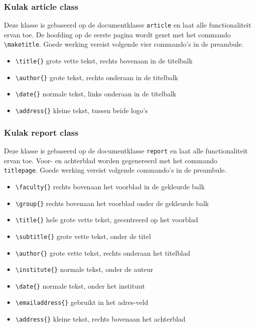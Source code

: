 \documentclass[kulak]{kulakarticle} %
\begin{document}
\subsubsection{Kulak article class}

Deze klasse is gebaseerd op de documentklasse \texttt{article} en laat alle functionaliteit ervan toe. De hoofding op de eerste pagina wordt gezet met het commando \verb+\maketitle+. Goede werking vereist volgende vier commando's in de preambule.
\begin{itemize}
\item \verb+\title{}+ grote vette tekst, rechts bovenaan in de titelbalk
\item \verb+\author{}+ grote tekst, rechts onderaan in de titelbalk
\item \verb+\date{}+ normale tekst, links onderaan in de titelbalk
\item \verb+\address{}+ kleine tekst, tussen beide logo's
\end{itemize}

\subsubsection{Kulak report class}

Deze klasse is gebaseerd op de documentklasse \texttt{report} en laat alle functionaliteit ervan toe. Voor- en achterblad worden gegenereerd met het commando \verb+titlepage+. Goede werking vereist volgende commando's in de preambule.

\begin{itemize}
\item \verb+\faculty{}+ rechts bovenaan het voorblad in de gekleurde balk
\item \verb+\group{}+ rechts bovenaan het voorblad onder de gekleurde balk
\item \verb+\title{}+ hele grote vette tekst, gecentreerd op het voorblad
\item \verb+\subtitle{}+ grote vette tekst, onder de titel
\item \verb+\author{}+ grote vette tekst, rechts onderaan het titelblad
\item \verb+\institute{}+ normale tekst, onder de auteur
\item \verb+\date{}+ normale tekst, onder het instituut
\item \verb+\emailaddress{}+ gebruikt in het adres-veld
\item \verb+\address{}+ kleine tekst, rechts bovenaan het achterblad
\end{itemize}
\end{document}
